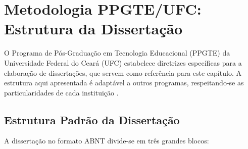 \section{Metodologia PPGTE/UFC: Estrutura da Dissertação}
\label{sec:metodologia-ppgte-ufc}
\nivelavancado

O Programa de Pós-Graduação em Tecnologia Educacional (PPGTE) da Universidade
Federal do Ceará (UFC) estabelece diretrizes específicas para a elaboração de
dissertações, que servem como referência para este capítulo. A estrutura aqui
apresentada é adaptável a outros programas, respeitando-se as particularidades
de cada instituição \cite{abnt2023nbr14724}.

\subsection{Estrutura Padrão da Dissertação}

A dissertação no formato ABNT divide-se em três grandes blocos:

